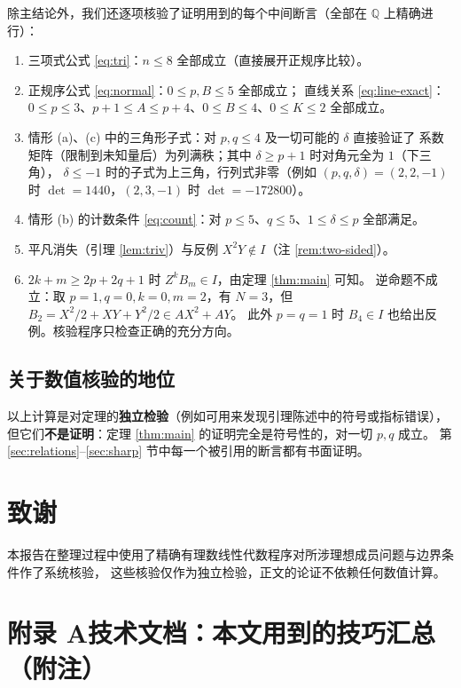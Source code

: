 \documentclass[11pt,UTF8]{ctexart}
\theoremstyle{definition}
\newcommand{\Q}{\mathbb{Q}}
\begin{document}
除主结论外，我们还逐项核验了证明用到的每个中间断言（全部在 $\Q$ 上精确进行）：

\begin{enumerate}[label=(\arabic*)]
\item 三项式公式 \eqref{eq:tri}：$n\le8$ 全部成立（直接展开正规序比较）。
\item 正规序公式 \eqref{eq:normal}：$0\le p,B\le5$ 全部成立；
直线关系 \eqref{eq:line-exact}：$0\le p\le3$、$p+1\le A\le p+4$、$0\le B\le4$、$0\le K\le2$ 全部成立。
\item 情形 (a)、(c) 中的三角形子式：对 $p,q\le4$ 及一切可能的 $\delta$ 直接验证了
系数矩阵（限制到未知量后）为列满秩；其中 $\delta\ge p+1$ 时对角元全为 $1$（下三角），
$\delta\le-1$ 时的子式为上三角，行列式非零（例如 $(p,q,\delta)=(2,2,-1)$ 时
$\det=1440$，$(2,3,-1)$ 时 $\det=-172800$）。
\item 情形 (b) 的计数条件 \eqref{eq:count}：对 $p\le5$、$q\le5$、$1\le\delta\le p$ 全部满足。
\item 平凡消失（引理 \ref{lem:triv}）与反例 $X^2Y\notin I$（注 \ref{rem:two-sided}）。
\item $2k+m\ge 2p+2q+1$ 时 $Z^{k}B_m\in I$，由定理 \ref{thm:main} 可知。
逆命题不成立：取 $p=1,q=0,k=0,m=2$，有 $N=3$，但 $B_2=X^2/2+XY+Y^2/2\in AX^2+AY$。
此外 $p=q=1$ 时 $B_4\in I$ 也给出反例。核验程序只检查正确的充分方向。
\end{enumerate}

\subsection{关于数值核验的地位}

以上计算是对定理的\textbf{独立检验}（例如可用来发现引理陈述中的符号或指标错误），
但它们\textbf{不是证明}：定理 \ref{thm:main} 的证明完全是符号性的，对一切 $p,q$ 成立。
第 \ref{sec:relations}--\ref{sec:sharp} 节中每一个被引用的断言都有书面证明。

\section*{致谢}
本报告在整理过程中使用了精确有理数线性代数程序对所涉理想成员问题与边界条件作了系统核验，
这些核验仅作为独立检验，正文的论证不依赖任何数值计算。

\appendix
{}
\section*{附录 A\quad 技术文档：本文用到的技巧汇总（附注）}
\end{document}
